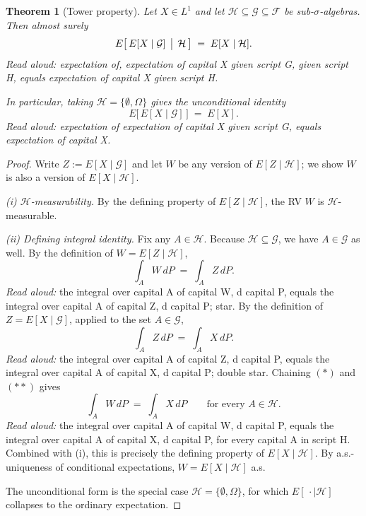 \documentclass[11pt]{article}
\newtheorem{theorem}{Theorem}
\theoremstyle{definition}
\begin{document}
\begin{theorem}[Tower property]
Let $X \in L^1$ and let $\mathcal{H} \subseteq \mathcal{G} \subseteq \mathcal{F}$ be sub-$\sigma$-algebras. Then almost surely
\[
E\bigl[\,E[X \mid \mathcal{G}] \,\bigm|\, \mathcal{H}\,\bigr] \;=\; E[X \mid \mathcal{H}].
\]
\emph{Read aloud:} expectation of, expectation of capital X given script G, given script H, equals expectation of capital X given script H.

In particular, taking $\mathcal{H} = \{\emptyset, \Omega\}$ gives the unconditional identity
\[
E\bigl[\,E[X \mid \mathcal{G}]\,\bigr] \;=\; E[X].
\]
\emph{Read aloud:} expectation of expectation of capital X given script G, equals expectation of capital X.
\end{theorem}

\begin{proof}
Write $Z := E[X \mid \mathcal{G}]$ and let $W$ be any version of $E[Z \mid \mathcal{H}]$; we show $W$ is also a version of $E[X \mid \mathcal{H}]$.

\emph{(i) $\mathcal{H}$-measurability.} By the defining property of $E[Z \mid \mathcal{H}]$, the RV $W$ is $\mathcal{H}$-measurable.

\emph{(ii) Defining integral identity.} Fix any $A \in \mathcal{H}$. Because $\mathcal{H} \subseteq \mathcal{G}$, we have $A \in \mathcal{G}$ as well. By the definition of $W = E[Z \mid \mathcal{H}]$,
\[
\int_A W \, dP \;=\; \int_A Z \, dP. \tag{$\ast$}
\]
\emph{Read aloud:} the integral over capital A of capital W, d capital P, equals the integral over capital A of capital Z, d capital P; star.
By the definition of $Z = E[X \mid \mathcal{G}]$, applied to the set $A \in \mathcal{G}$,
\[
\int_A Z \, dP \;=\; \int_A X \, dP. \tag{$\ast\ast$}
\]
\emph{Read aloud:} the integral over capital A of capital Z, d capital P, equals the integral over capital A of capital X, d capital P; double star.
Chaining $(\ast)$ and $(\ast\ast)$ gives
\[
\int_A W \, dP \;=\; \int_A X \, dP \qquad \text{for every } A \in \mathcal{H}.
\]
\emph{Read aloud:} the integral over capital A of capital W, d capital P, equals the integral over capital A of capital X, d capital P, for every capital A in script H.
Combined with (i), this is precisely the defining property of $E[X \mid \mathcal{H}]$. By a.s.-uniqueness of conditional expectations, $W = E[X \mid \mathcal{H}]$ a.s.

The unconditional form is the special case $\mathcal{H} = \{\emptyset, \Omega\}$, for which $E[\,\cdot \mid \mathcal{H}]$ collapses to the ordinary expectation.
\end{proof}
\end{document}
